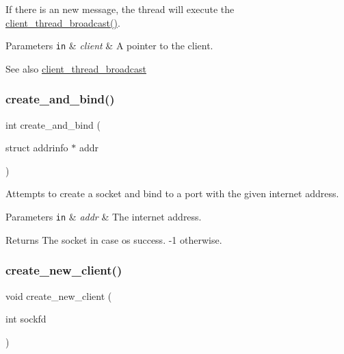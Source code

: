 If there is an new message, the thread will execute the \hyperlink{zip-zop-server_8c_a3608e5c14908c59afe16bf1fc85895c9}{client\+\_\+thread\+\_\+broadcast()}.


\begin{DoxyParams}[1]{Parameters}
\mbox{\tt in}  & {\em client} & A pointer to the client.\\
\hline
\end{DoxyParams}
\begin{DoxySeeAlso}{See also}
\hyperlink{zip-zop-server_8c_a3608e5c14908c59afe16bf1fc85895c9}{client\+\_\+thread\+\_\+broadcast} 
\end{DoxySeeAlso}
\mbox{\label{zip-zop-server_8c_a0ecdeaf556729d827a07915b7a89866c}} 
\subsubsection{\texorpdfstring{create\+\_\+and\+\_\+bind()}{create\_and\_bind()}}
{\footnotesize\ttfamily int create\+\_\+and\+\_\+bind (\begin{DoxyParamCaption}\item[{struct addrinfo $\ast$}]{addr }\end{DoxyParamCaption})}



Attempts to create a socket and bind to a port with the given internet address. 


\begin{DoxyParams}[1]{Parameters}
\mbox{\tt in}  & {\em addr} & The internet address.\\
\hline
\end{DoxyParams}
\begin{DoxyReturn}{Returns}
The socket in case os success. {\ttfamily -\/1} otherwise. 
\end{DoxyReturn}
\mbox{\label{zip-zop-server_8c_ab9a14cd690eac9781dd224e034fbd01d}} 
\subsubsection{\texorpdfstring{create\+\_\+new\+\_\+client()}{create\_new\_client()}}
{\footnotesize\ttfamily void create\+\_\+new\+\_\+client (\begin{DoxyParamCaption}\item[{int}]{sockfd }\end{DoxyParamCaption})}



